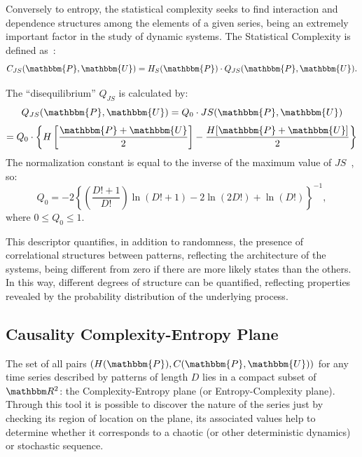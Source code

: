 Conversely to entropy, the statistical complexity seeks to find interaction and dependence structures among the elements of a given series, being an extremely important factor in the study of dynamic systems.
The Statistical Complexity is defined as~\cite{Lamberti2004Entropic}:
\begin{equation}
    C_{JS}(\mathbbm{P}, \mathbbm{U}) = H_S(\mathbbm{P}) \cdot Q_{JS}(\mathbbm{P}, \mathbbm{U}).
\end{equation}

The ``disequilibrium'' $Q_{JS}$ is calculated by:
\begin{equation}
    Q_{JS}(\mathbbm{P}, \mathbbm{U}) = Q_0 \cdot JS(\mathbbm{P}, \mathbbm{U})
\end{equation}
\begin{equation}
    = Q_0 \cdot \left\{ H \left[ \frac{\mathbbm{P} + \mathbbm{U}}{2} \right] - \frac{H[\mathbbm{P} + \mathbbm{U}]}{2} \right\}
\end{equation}
The normalization constant is equal to the inverse of the maximum value of $JS$~\citep{rosso2007extracting}, so:
\begin{equation}
    Q_0 = -2 \left\{ \left( \frac{D! + 1}{D!} \right) \ln{(D! + 1)} - 2\ln{(2D!)} + \ln{(D!)} \right\}^{-1},
\end{equation}
where $0 \leq Q_0 \leq 1$.

This descriptor quantifies, in addition to randomness, the presence of correlational structures between patterns, reflecting the architecture of the systems, being different from zero if there are more likely states than the others.
In this way, different degrees of structure can be quantified, reflecting properties revealed by the probability distribution of the underlying process.

\subsection{Causality Complexity-Entropy Plane}

The set of all pairs $(H(\mathbbm{P}), C(\mathbbm{P}, \mathbbm{U}))$ for any time series described by patterns of length $D$ lies in a compact subset of $\mathbbm R^2$: the Complexity-Entropy plane (or Entropy-Complexity plane).
Through this tool it is possible to discover the nature of the series just by checking its region of location on the plane, its associated values help to determine whether it corresponds to a chaotic (or other deterministic dynamics) or stochastic sequence.

